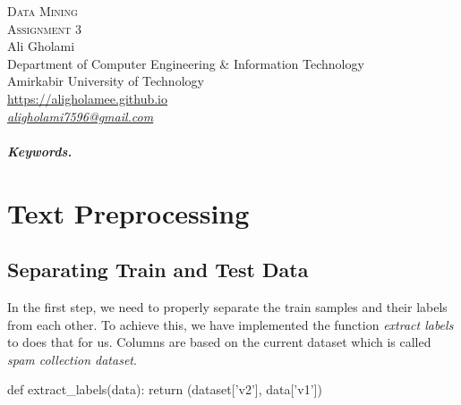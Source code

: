 \documentclass[12pt]{article}
\numberwithin{equation}{section}
\numberwithin{table}{section}
\numberwithin{figure}{section}
\begin{document}

\begin{center}
\textsc{\Huge Data Mining} \\[2pt]
	\textsc{\Large Assignment 3}\\
	\vspace{0.5cm}
  Ali Gholami \\[6pt]
  Department of Computer Engineering \& Information Technology\\
  Amirkabir University of Technology  \\[6pt]
  \def\UrlFont{\em}
  \url{https://aligholamee.github.io}\\
\href{mailto:aligholami7596@gmail.com}{\textit{aligholami7596@gmail.com}}
\end{center}

\begin{abstract}

\end{abstract} 

\subparagraph{Keywords.} \textit{}

\section{Text Preprocessing}
\subsection{Separating Train and Test Data}
In the first step, we need to properly separate the train samples and their labels from each other. To achieve this, we have implemented the function \textit{extract labels} to does that for us. Columns are based on the current dataset which is called \textit{spam collection dataset}.

\begin{python}
	def extract_labels(data):
		return (dataset['v2'], data['v1'])
\end{python}
\end{document}
